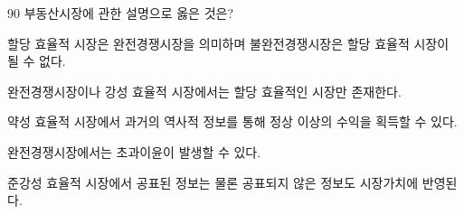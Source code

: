 \begin{question}{90}
부동산시장에 관한 설명으로 옳은 것은?
\begin{choices}
  \item 할당 효율적 시장은 완전경쟁시장을 의미하며 불완전경쟁시장은 할당 효율적 시장이 될 수 없다.
  \item 완전경쟁시장이나 강성 효율적 시장에서는 할당 효율적인 시장만 존재한다.
  \item 약성 효율적 시장에서 과거의 역사적 정보를 통해 정상 이상의 수익을 획득할 수 있다.
  \item 완전경쟁시장에서는 초과이윤이 발생할 수 있다.
  \item 준강성 효율적 시장에서 공표된 정보는 물론 공표되지 않은 정보도 시장가치에 반영된다.
\end{choices}
\end{question}
